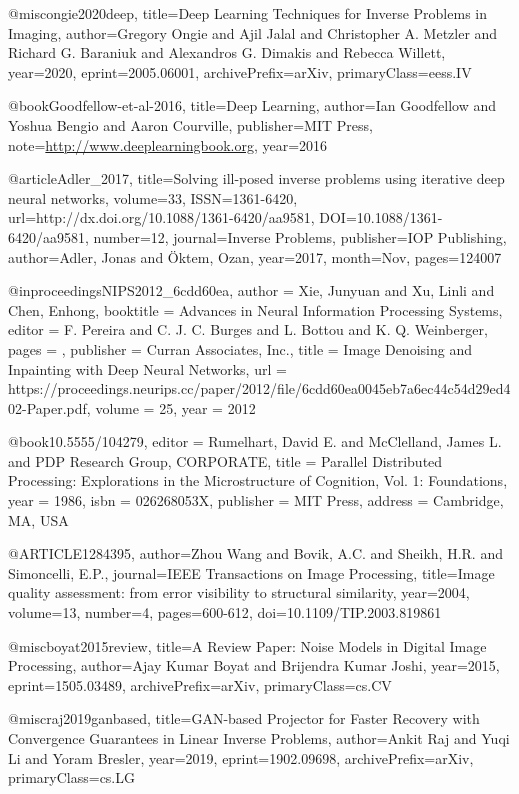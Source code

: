 @misc{ongie2020deep,
      title={Deep Learning Techniques for Inverse Problems in Imaging}, 
      author={Gregory Ongie and Ajil Jalal and Christopher A. Metzler and Richard G. Baraniuk and Alexandros G. Dimakis and Rebecca Willett},
      year={2020},
      eprint={2005.06001},
      archivePrefix={arXiv},
      primaryClass={eess.IV}
}

@book{Goodfellow-et-al-2016,
    title={Deep Learning},
    author={Ian Goodfellow and Yoshua Bengio and Aaron Courville},
    publisher={MIT Press},
    note={\url{http://www.deeplearningbook.org}},
    year={2016}
}

@article{Adler_2017,
	title={Solving ill-posed inverse problems using iterative deep neural networks},
	volume={33},
	ISSN={1361-6420},
	url={http://dx.doi.org/10.1088/1361-6420/aa9581},
	DOI={10.1088/1361-6420/aa9581},
	number={12},
	journal={Inverse Problems},
	publisher={IOP Publishing},
	author={Adler, Jonas and Öktem, Ozan},
	year={2017},
	month={Nov},
	pages={124007}
}

@inproceedings{NIPS2012_6cdd60ea,
	author = {Xie, Junyuan and Xu, Linli and Chen, Enhong},
	booktitle = {Advances in Neural Information Processing Systems},
	editor = {F. Pereira and C. J. C. Burges and L. Bottou and K. Q. Weinberger},
	pages = {},
	publisher = {Curran Associates, Inc.},
	title = {Image Denoising and Inpainting with Deep Neural Networks},
	url = {https://proceedings.neurips.cc/paper/2012/file/6cdd60ea0045eb7a6ec44c54d29ed402-Paper.pdf},
	volume = {25},
	year = {2012}
}

@book{10.5555/104279,
	editor = {Rumelhart, David E. and McClelland, James L. and PDP Research Group, CORPORATE},
	title = {Parallel Distributed Processing: Explorations in the Microstructure of Cognition, Vol. 1: Foundations},
	year = {1986},
	isbn = {026268053X},
	publisher = {MIT Press},
	address = {Cambridge, MA, USA}
}

@ARTICLE{1284395,
	author={Zhou Wang and Bovik, A.C. and Sheikh, H.R. and Simoncelli, E.P.},
	journal={IEEE Transactions on Image Processing}, 
	title={Image quality assessment: from error visibility to structural similarity}, 
	year={2004},
	volume={13},
	number={4},
	pages={600-612},
	doi={10.1109/TIP.2003.819861}}

@misc{boyat2015review,
	title={A Review Paper: Noise Models in Digital Image Processing}, 
	author={Ajay Kumar Boyat and Brijendra Kumar Joshi},
	year={2015},
	eprint={1505.03489},
	archivePrefix={arXiv},
	primaryClass={cs.CV}
}

@misc{raj2019ganbased,
	title={GAN-based Projector for Faster Recovery with Convergence Guarantees in Linear Inverse Problems}, 
	author={Ankit Raj and Yuqi Li and Yoram Bresler},
	year={2019},
	eprint={1902.09698},
	archivePrefix={arXiv},
	primaryClass={cs.LG}
}

